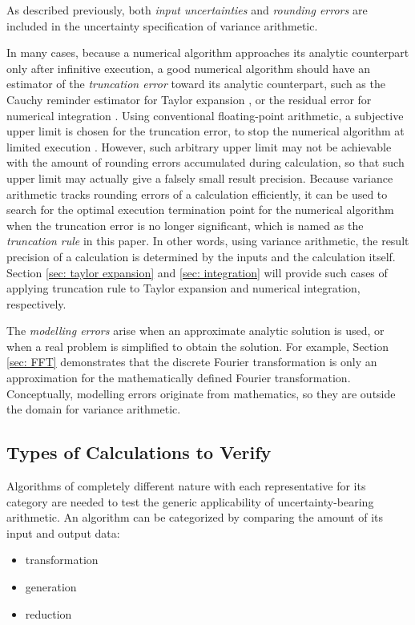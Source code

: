 \documentclass[twoside]{article}
\numberwithin{equation}{section}
\begin{document}
As described previously, both \emph{input uncertainties} and \emph{rounding errors} are included in the uncertainty specification of variance arithmetic.

In many cases, because a numerical algorithm approaches its analytic counterpart only after infinitive execution, a good numerical algorithm should have an estimator of the \emph{truncation error} toward its analytic counterpart, such as the Cauchy reminder estimator for Taylor expansion \cite{Numerical_Recipes}, or the residual error for numerical integration \cite{Numerical_Recipes}.  
Using conventional floating-point arithmetic, a subjective upper limit is chosen for the truncation error, to stop the numerical algorithm at limited execution \cite{Numerical_Recipes}. 
However, such arbitrary upper limit may not be achievable with the amount of rounding errors accumulated during calculation, so that such upper limit may actually give a falsely small result precision. 
Because variance arithmetic tracks rounding errors of a calculation efficiently, it can be used to search for the optimal execution termination point for the numerical algorithm when the truncation error is no longer significant, which is named as the \emph{truncation rule} in this paper. In other words, using variance arithmetic, the result precision of a calculation is determined by the inputs and the calculation itself.  
Section \ref{sec: taylor expansion} and \ref{sec: integration} will provide such cases of applying truncation rule to Taylor expansion and numerical integration, respectively.

The \emph{modelling errors} arise when an approximate analytic solution is used, or when a real problem is simplified to obtain the solution.  
For example, Section \ref{sec: FFT} demonstrates that the discrete Fourier transformation is only an approximation for the mathematically defined Fourier transformation.  
Conceptually, modelling errors originate from mathematics, so they are outside the domain for variance arithmetic.


\subsection{Types of Calculations to Verify \cite{Prev_Precision_Arithmetic}}

Algorithms of completely different nature with each representative for its category are needed to test the generic applicability of uncertainty-bearing arithmetic.  
An algorithm can be categorized by comparing the amount of its input and output data:
\begin{itemize}
\item transformation
\item generation
\item reduction
\end{itemize}
\end{document}
